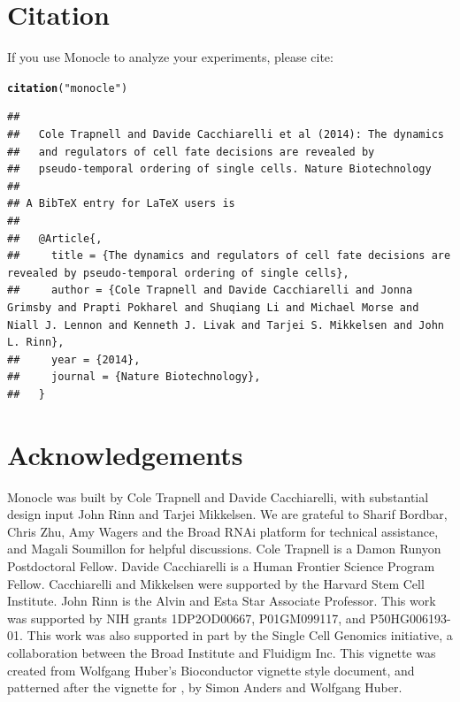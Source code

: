 \documentclass[10pt,oneside]{article}\usepackage[]{graphicx}\usepackage[]{color}
\makeatletter
\newcommand{\hlstr}[1]{\textcolor[rgb]{0.192,0.494,0.8}{#1}}%
\newcommand{\hlstd}[1]{\textcolor[rgb]{0.345,0.345,0.345}{#1}}%
\newcommand{\hlkwd}[1]{\textcolor[rgb]{0.737,0.353,0.396}{\textbf{#1}}}%
\newenvironment{kframe}{%
 \def\at@end@of@kframe{}%
 \ifinner\ifhmode%
  \def\at@end@of@kframe{\end{minipage}}%
  \begin{minipage}{\columnwidth}%
 \fi\fi%
 \def\FrameCommand##1{\hskip\@totalleftmargin \hskip-\fboxsep
 \colorbox{shadecolor}{##1}\hskip-\fboxsep
     \hskip-\linewidth \hskip-\@totalleftmargin \hskip\columnwidth}%
 \MakeFramed {\advance\hsize-\width
   \@totalleftmargin\z@ \linewidth\hsize
   \@setminipage}}%
 {\par\unskip\endMakeFramed%
 \at@end@of@kframe}
\newenvironment{knitrout}{}{} %
\makeatother
\begin{document}

\section{Citation}
If you use Monocle to analyze your experiments, please cite:
\begin{knitrout}
\color{fgcolor}\begin{kframe}
\begin{alltt}
\hlkwd{citation}\hlstd{(}\hlstr{"monocle"}\hlstd{)}
\end{alltt}
\begin{verbatim}
## 
##   Cole Trapnell and Davide Cacchiarelli et al (2014): The dynamics
##   and regulators of cell fate decisions are revealed by
##   pseudo-temporal ordering of single cells. Nature Biotechnology
## 
## A BibTeX entry for LaTeX users is
## 
##   @Article{,
##     title = {The dynamics and regulators of cell fate decisions are revealed by pseudo-temporal ordering of single cells},
##     author = {Cole Trapnell and Davide Cacchiarelli and Jonna Grimsby and Prapti Pokharel and Shuqiang Li and Michael Morse and Niall J. Lennon and Kenneth J. Livak and Tarjei S. Mikkelsen and John L. Rinn},
##     year = {2014},
##     journal = {Nature Biotechnology},
##   }
\end{verbatim}
\end{kframe}
\end{knitrout}

\section{Acknowledgements}

Monocle was built by Cole Trapnell and Davide Cacchiarelli, with substantial design input John Rinn and Tarjei Mikkelsen. We are grateful to Sharif Bordbar, Chris Zhu, Amy Wagers and the Broad RNAi platform for technical assistance, and Magali Soumillon for helpful discussions. Cole Trapnell is a Damon Runyon Postdoctoral Fellow. Davide Cacchiarelli is a Human Frontier Science Program Fellow. Cacchiarelli and Mikkelsen were supported by the Harvard Stem Cell Institute. John Rinn is the Alvin and Esta Star Associate Professor. This work was supported by NIH grants 1DP2OD00667, P01GM099117, and P50HG006193-01. This work was also supported in part by the Single Cell Genomics initiative, a collaboration between the Broad Institute and Fluidigm Inc. This vignette was created from Wolfgang Huber's Bioconductor vignette style document, and patterned after the vignette for , by Simon Anders and Wolfgang Huber.
\end{document}
